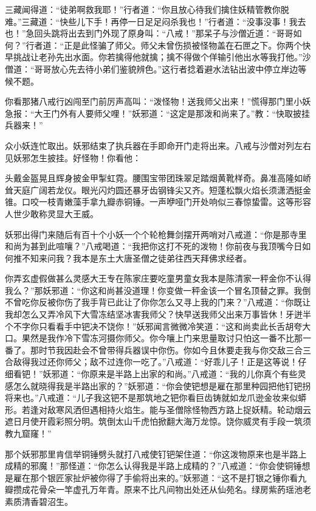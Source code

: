 \documentclass[12pt,UTF8]{ctexbook}
\begin{document}
三藏闻得道：“徒弟啊救我耶！”行者道：“你且放心待我们擒住妖精管教你脱难。”三藏道：“快些儿下手！再停一日足足闷杀我也！”行者道：“没事没事！我去也！”急回头跳将出去到门外现了原身叫：“八戒！”那呆子与沙僧近道：“哥哥如何？”行者道：“正是此怪骗了师父。师父未曾伤损被怪物盖在石匣之下。你两个快早挑战让老孙先出水面。你若擒得他就擒；擒不得做个佯输引他出水等我打他。”沙僧道：“哥哥放心先去待小弟们鉴貌辨色。”这行者捻着避水法钻出波中停立岸边等候不题。

你看那猪八戒行凶闯至门前厉声高叫：“泼怪物！送我师父出来！”慌得那门里小妖急报：“大王门外有人要师父哩！”妖邪道：“这定是那泼和尚来了。”教：“快取披挂兵器来！”

众小妖连忙取出。妖邪结束了执兵器在手即命开门走将出来。八戒与沙僧对列左右见妖邪怎生披挂。好怪物！你看他：

头戴金盔晃且辉身披金甲掣虹霓。腰围宝带团珠翠足踏烟黄靴样奇。鼻准高隆如峤耸天庭广阔若龙仪。眼光闪灼圆还暴牙齿钢锋尖又齐。短蓬松飘火焰长须潇洒挺金锥。口咬一枝青嫩藻手拿九瓣赤铜锤。一声咿哑门开处响似三春惊蛰雷。这等形容人世少敢称灵显大王威。

妖邪出得门来随后有百十个小妖一个个轮枪舞剑摆开两哨对八戒道：“你是那寺里和尚为甚到此喧嚷？”八戒喝道：“我把你这打不死的泼物！你前夜与我顶嘴今日如何推不知来问我？我本是东土大唐圣僧之徒弟往西天拜佛求经者。

你弄玄虚假做甚么灵感大王专在陈家庄要吃童男童女我本是陈清家一秤金你不认得我么？”那妖邪道：“你这和尚甚没道理！你变做一秤金该一个冒名顶替之罪。我倒不曾吃你反被你伤了我手背已此让了你你怎么又寻上我的门来？”八戒道：“你既让我却怎么又弄冷风下大雪冻结坚冰害我师父？快早送我师父出来万事皆休！牙迸半个不字你只看看手中钯决不饶你！”妖邪闻言微微冷笑道：“这和尚卖此长舌胡夸大口。果然是我作冷下雪冻河摄你师父。你今嚷上门来思量取讨只怕这一番不比那一番了。那时节我因赴会不曾带得兵器误中你伤。你如今且休要走我与你交敌三合三合敌得我过还你师父；敌不过连你一吃了。”八戒道：“好乖儿子！正是这等说！仔细看钯！”妖邪道：“你原来是半路上出家的和尚。”八戒道：“我的儿你真个有些灵感怎么就晓得我是半路出家的？”妖邪道：“你会使钯想是雇在那里种园把他钉钯拐将来也。”八戒道：“儿子我这钯不是那筑地之钯你看巨齿铸就如龙爪逊金妆来似蟒形。若逢对敌寒风洒但遇相持火焰生。能与圣僧除怪物西方路上捉妖精。轮动烟云遮日月使开霞彩照分明。筑倒太山千虎怕掀翻大海万龙惊。饶你威灵有手段一筑须教九窟窿！”

那个妖邪那里肯信举铜锤劈头就打八戒使钉钯架住道：“你这泼物原来也是半路上成精的邪魔！”那怪道：“你怎么认得我是半路上成精的？”八戒道：“你会使铜锤想是雇在那个银匠家扯炉被你得了手偷将出来的。”妖邪道：“这不是打银之锤你看九瓣攒成花骨朵一竿虚孔万年青。原来不比凡间物出处还从仙苑名。绿房紫菂瑶池老素质清香碧沼生。
\end{document}
